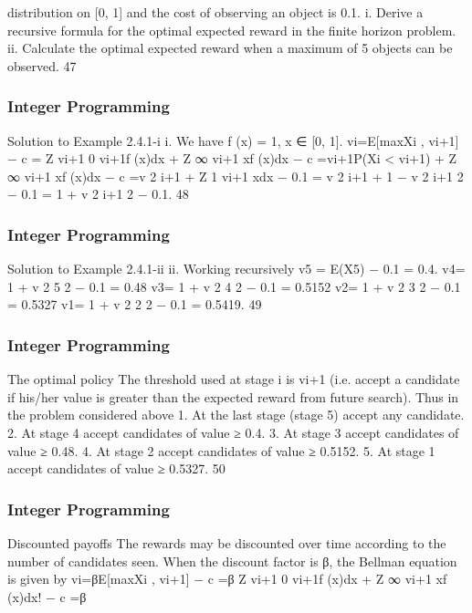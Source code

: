 \begin{frame}
distribution on [0, 1] and the cost of observing an object is 0.1.
i. Derive a recursive formula for the optimal expected
reward in the finite horizon problem.
ii. Calculate the optimal expected reward when a
maximum of 5 objects can be observed.
47 \end{frame}  \begin{frame} \frametitle{Integer Programming}     
Solution to Example 2.4.1-i
i. We have f (x) = 1, x ∈ [0, 1].
vi=E[max{Xi
, vi+1}] − c
=
Z vi+1
0
vi+1f (x)dx +
Z ∞
vi+1
xf (x)dx − c
=vi+1P(Xi < vi+1) + Z ∞
vi+1
xf (x)dx − c
=v
2
i+1 +
Z 1
vi+1
xdx − 0.1 = v
2
i+1 +
1 − v
2
i+1
2
− 0.1
=
1 + v
2
i+1
2
− 0.1.
48 \end{frame}  \begin{frame} \frametitle{Integer Programming}     
Solution to Example 2.4.1-ii
ii. Working recursively v5 = E(X5) − 0.1 = 0.4.
v4=
1 + v
2
5
2
− 0.1 = 0.48
v3=
1 + v
2
4
2
− 0.1 = 0.5152
v2=
1 + v
2
3
2
− 0.1 = 0.5327
v1=
1 + v
2
2
2
− 0.1 = 0.5419.
49 \end{frame}  \begin{frame} \frametitle{Integer Programming}     
The optimal policy
The threshold used at stage i is vi+1 (i.e. accept a candidate if
his/her value is greater than the expected reward from future
search).
Thus in the problem considered above
1. At the last stage (stage 5) accept any candidate.
2. At stage 4 accept candidates of value ≥ 0.4.
3. At stage 3 accept candidates of value ≥ 0.48.
4. At stage 2 accept candidates of value ≥ 0.5152.
5. At stage 1 accept candidates of value ≥ 0.5327.
50 \end{frame}  \begin{frame} \frametitle{Integer Programming}     
Discounted payoffs
The rewards may be discounted over time according to the number
of candidates seen. When the discount factor is β, the Bellman
equation is given by
vi=βE[max{Xi
, vi+1}] − c
=β
 Z vi+1
0
vi+1f (x)dx +
Z ∞
vi+1
xf (x)dx!
− c
=β


\end{frame}
